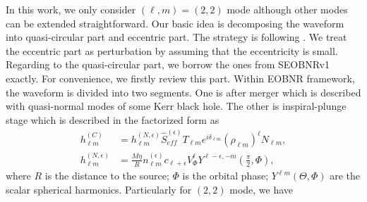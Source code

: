 \documentclass[prd,aps,a4paper,superscriptaddress,twocolumn,footinbib,showpacs]{revtex4}
\begin{document}
In this work, we only consider $(\ell,m)=(2,2)$ mode although other modes can be extended straightforward. Our basic idea is decomposing the waveform into quasi-circular part and eccentric part. The strategy is following \cite{PhysRevD.95.024038}. We treat the eccentric part as perturbation by assuming that the eccentricity is small. Regarding to the quasi-circular part, we borrow the ones from SEOBNRv1 exactly. For convenience, we firstly review this part. Within EOBNR framework, the waveform is divided into two segments. One is after merger which is described with quasi-normal modes of some Kerr black hole. The other is inspiral-plunge stage which is described in the factorized form as \cite{PhysRevD.84.124052}
\begin{align}
h_{\ell m}^{(C)}&=h_{\ell m}^{(N,\epsilon)}\hat{S}_{eff}^{(\epsilon)}T_{\ell m}e^{i\delta_{\ell m}}(\rho_{\ell m})^\ell N_{\ell m},\label{CEOB}\\
h_{\ell m}^{(N,\epsilon)}&=\frac{M\eta}{R}n_{\ell m}^{(\epsilon)}c_{\ell+\epsilon}V_\Phi^\ell Y^{\ell-\epsilon,-m}(\frac{\pi}{2},\Phi),
\end{align}
where $R$ is the distance to the source; $\Phi$ is the orbital phase; $Y^{\ell m}(\Theta,\Phi)$ are the scalar spherical harmonics. Particularly for $(2,2)$ mode, we have \cite{PhysRevD.83.064003,PhysRevD.84.124052,PhysRevD.86.024011}
\end{document}
